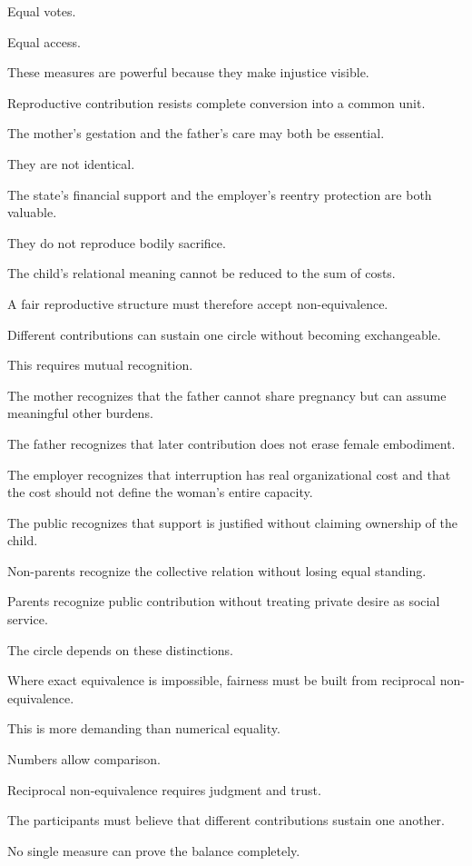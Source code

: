 Equal votes.

Equal access.

These measures are powerful because they make injustice visible.

Reproductive contribution resists complete conversion into a common unit.

The mother’s gestation and the father’s care may both be essential.

They are not identical.

The state’s financial support and the employer’s reentry protection are both valuable.

They do not reproduce bodily sacrifice.

The child’s relational meaning cannot be reduced to the sum of costs.

A fair reproductive structure must therefore accept non-equivalence.

Different contributions can sustain one circle without becoming exchangeable.

This requires mutual recognition.

The mother recognizes that the father cannot share pregnancy but can assume meaningful other burdens.

The father recognizes that later contribution does not erase female embodiment.

The employer recognizes that interruption has real organizational cost and that the cost should not define the woman’s entire capacity.

The public recognizes that support is justified without claiming ownership of the child.

Non-parents recognize the collective relation without losing equal standing.

Parents recognize public contribution without treating private desire as social service.

The circle depends on these distinctions.

Where exact equivalence is impossible, fairness must be built from reciprocal non-equivalence.

This is more demanding than numerical equality.

Numbers allow comparison.

Reciprocal non-equivalence requires judgment and trust.

The participants must believe that different contributions sustain one another.

No single measure can prove the balance completely.


